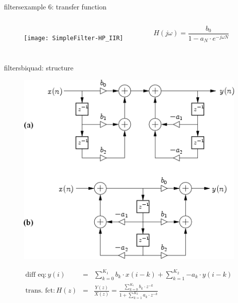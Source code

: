 	\begin{frame}{filters}{example 6: transfer function}
        \vspace{-10mm}
        \begin{columns}
		\begin{figure}
			\centerline{\texttt{[image: SimpleFilter-HP\_IIR]}}
		\end{figure}
    	\begin{equation*}
    		H(j\omega) = \frac{b_0}{1-a_N\cdot e^{-j\omega N}}
    	\end{equation*}
        \end{columns}
	\end{frame}
	\begin{frame}{filters}{biquad: structure}
        \vspace{-3mm}
		\begin{figure}
			\centerline{\includegraphics[scale=.3]{graph/general_biquad_jos}}
		    \label{fig:general_biquad}
		\end{figure}
		\pause
		\vspace{-3mm}
		\begin{eqnarray*}
			\text{diff eq}: y(i) 	&=& \sum_{k=0}^{K_1}{b_k\cdot x(i-k)} + \sum_{k=1}^{K_2}{-a_k\cdot y(i-k)} \nonumber\\
			\text{trans. fct}: H(z) 	&=& \frac{Y(z)}{X(z)} =  \frac{\sum_{k=0}^{K_1}{b_k\cdot z^{-k}}}{1 + \sum_{k=1}^{K_2}{a_k\cdot z^{-k}}} 
		\end{eqnarray*}
	\end{frame}

